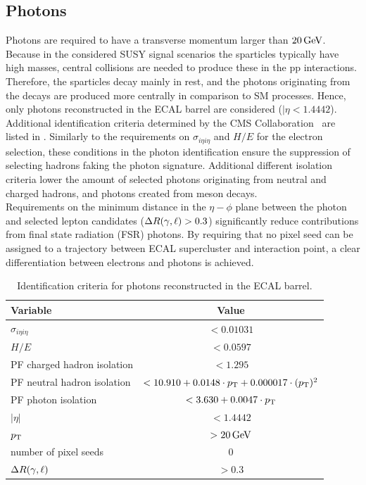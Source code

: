 \subsection{Photons}
Photons are required to have a transverse momentum larger than $20\,\text{Ge\hspace{-.08em}V}$.  Because in the considered SUSY signal scenarios the sparticles typically have high masses, central collisions are needed to produce these in the pp interactions. Therefore, the sparticles decay mainly in rest, and the photons originating from the decays are produced more centrally in comparison to SM processes. Hence, only photons reconstructed in the ECAL barrel are considered ($|\eta<1.4442$). Additional identification criteria determined by the CMS Collaboration~\cite{photonID} are listed in .
Similarly to the requirements on $\sigma_{i\eta i\eta}$ and $H/E$ for the electron selection, these conditions in the photon identification ensure the suppression of selecting hadrons faking the photon signature. Additional different isolation criteria lower the amount of selected photons originating from neutral and charged hadrons, and photons created from meson decays.\\
Requirements on the minimum distance in the $\eta-\phi$ plane between the photon and selected lepton candidates ($\Delta R(\gamma,\ell)>0.3$) significantly reduce contributions from final state radiation (FSR) photons. By requiring that no pixel seed can be assigned to a trajectory between ECAL supercluster and interaction point, a clear differentiation between electrons and photons is achieved.
\begin{table}[b]
 \centering
 \caption{Identification criteria for photons reconstructed in the ECAL barrel.}
 \label{tab:photonID}
 \begin{tabular}{lc}
  Variable                    & Value                                                \\\hline
  $\sigma_{i\eta i\eta}$      & $<0.01031$                                           \\
  $H/E$                       & $<0.0597$                                            \\
  PF charged hadron isolation & $<1.295$                                             \\
  PF neutral hadron isolation & $<10.910 + 0.0148 \cdot p_{\mathrm{T}} + 0.000017\cdot (p_{\mathrm{T}})^2$ \\
  PF photon isolation         & $<3.630+0.0047\cdot p_{\mathrm{T}}$                             \\\hline
  $|\eta|$                    & $<1.4442$                                            \\
  $p_{\mathrm{T}}$                       & $>20\,\text{Ge\hspace{-.08em}V}$                                            \\
  number of pixel seeds       & $0$                                                  \\
  $\Delta R (\gamma,\ell)$      & $>0.3$                                               \\\hline
 \end{tabular}
\end{table}
